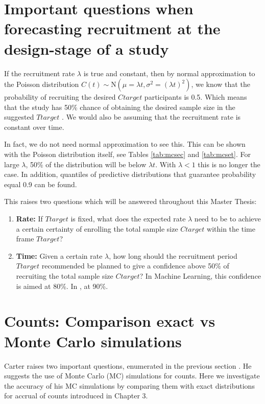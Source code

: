 \section{Important questions when forecasting recruitment at the design-stage of a study}

If the recruitment rate $\lambda$ is true and constant, then by normal approximation to the Poisson distribution $C(t)\sim \textrm{N}(\mu=\lambda t, \sigma^2=(\lambda t)^2)$, we know that the probability of recruiting the desired $Ctarget$ participants is 0.5. Which means that the study has 50\% chance of obtaining the desired sample size in the suggested $Ttarget$ \citep{carter2004application}. We would also be assuming that the recruitment rate is constant over time.

In fact, we do not need normal approximation to see this. This can be shown with the Poisson distribution itself, see Tables \ref{tab:mcsec} and \ref{tab:mcset}. For large $\lambda$, 50\% of the distribution will be below $\lambda t$. With $\lambda < 1$ this is no longer the case. In addition, quantiles of predictive distributions that guarantee probability equal 0.9 can be found.  

This raises two questions which will be answered throughout this Master Thesis:
\begin{enumerate}
\item \textbf{Rate:} If $Ttarget$ is fixed, what does the expected rate $\lambda$ need to be to achieve a certain certainty of enrolling the total sample size $Ctarget$ within the time frame $Ttarget$?
\item \textbf{Time:} Given a certain rate $\lambda$, how long should the recruitment period $Ttarget$ recommended be planned to give a confidence above 50\% of recruiting the total sample size $Ctarget$? In Machine Learning, this confidence is aimed at 80\%. In \cite{carter2004application}, at 90\%.
\end{enumerate}


\section{Counts: Comparison exact vs Monte Carlo simulations}

Carter raises two important questions, enumerated in the previous section \citep{carter2004application, carter2005practical}. He suggests the use of Monte Carlo (MC) simulations for counts. Here we investigate the accuracy of his MC simulations by comparing them with exact distributions for accrual of counts introduced in Chapter 3.

